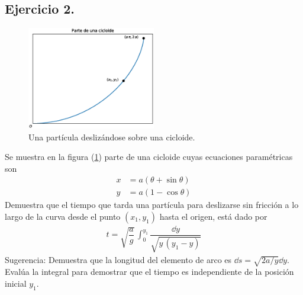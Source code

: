 \subsection{Ejercicio 2.}
\begin{figure}
    \centering
    \includegraphics[width=0.5\textwidth]{Imagenes/plot_cicloide.eps}
    \caption{Una partícula deslizándose sobre una cicloide.}
    \label{fig:figura_cicloide}
\end{figure}
Se muestra en la figura (\ref{fig:figura_cicloide}) parte de una cicloide cuyas ecuaciones paramétricas son
\begin{align*}
x &= a (\theta + \sin \theta) \\[0.5em]
y &= a (1 - \cos \theta)
\end{align*}
Demuestra que el tiempo que tarda una partícula para deslizarse sin fricción a lo largo de la curva desde el punto $(x_{1}, y_{1})$ hasta el origen, está dado por
\begin{align*}
t = \sqrt{\dfrac{a}{g}} \, \int_{0}^{y_{1}} \dfrac{\dd{y}}{\sqrt{y \, (y_{1}- y)}}
\end{align*}
Sugerencia: Demuestra que la longitud del elemento de arco es $\dd{s} = \sqrt{2a/y} \dd{y}$. Evalúa la integral para demostrar que el tiempo es independiente de la posición inicial $y_{1}$.
